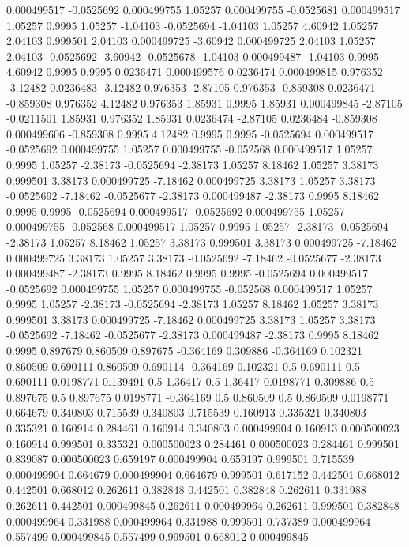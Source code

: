 0.000499517 -0.0525692
0.000499755 1.05257
0.000499755 -0.0525681
0.000499517 1.05257
0.9995 1.05257
-1.04103 -0.0525694
-1.04103 1.05257
4.60942 1.05257
2.04103 0.999501
2.04103 0.000499725
-3.60942 0.000499725
2.04103 1.05257
2.04103 -0.0525692
-3.60942 -0.0525678
-1.04103 0.000499487
-1.04103 0.9995
4.60942 0.9995
0.9995 0.0236471
0.000499576 0.0236474
0.000499815 0.976352
-3.12482 0.0236483
-3.12482 0.976353
-2.87105 0.976353
-0.859308 0.0236471
-0.859308 0.976352
4.12482 0.976353
1.85931 0.9995
1.85931 0.000499845
-2.87105 -0.0211501
1.85931 0.976352
1.85931 0.0236474
-2.87105 0.0236484
-0.859308 0.000499606
-0.859308 0.9995
4.12482 0.9995
0.9995 -0.0525694
0.000499517 -0.0525692
0.000499755 1.05257
0.000499755 -0.052568
0.000499517 1.05257
0.9995 1.05257
-2.38173 -0.0525694
-2.38173 1.05257
8.18462 1.05257
3.38173 0.999501
3.38173 0.000499725
-7.18462 0.000499725
3.38173 1.05257
3.38173 -0.0525692
-7.18462 -0.0525677
-2.38173 0.000499487
-2.38173 0.9995
8.18462 0.9995
0.9995 -0.0525694
0.000499517 -0.0525692
0.000499755 1.05257
0.000499755 -0.052568
0.000499517 1.05257
0.9995 1.05257
-2.38173 -0.0525694
-2.38173 1.05257
8.18462 1.05257
3.38173 0.999501
3.38173 0.000499725
-7.18462 0.000499725
3.38173 1.05257
3.38173 -0.0525692
-7.18462 -0.0525677
-2.38173 0.000499487
-2.38173 0.9995
8.18462 0.9995
0.9995 -0.0525694
0.000499517 -0.0525692
0.000499755 1.05257
0.000499755 -0.052568
0.000499517 1.05257
0.9995 1.05257
-2.38173 -0.0525694
-2.38173 1.05257
8.18462 1.05257
3.38173 0.999501
3.38173 0.000499725
-7.18462 0.000499725
3.38173 1.05257
3.38173 -0.0525692
-7.18462 -0.0525677
-2.38173 0.000499487
-2.38173 0.9995
8.18462 0.9995
0.897679 0.860509
0.897675 -0.364169
0.309886 -0.364169
0.102321 0.860509
0.690111 0.860509
0.690114 -0.364169
0.102321 0.5
0.690111 0.5
0.690111 0.0198771
0.139491 0.5
1.36417 0.5
1.36417 0.0198771
0.309886 0.5
0.897675 0.5
0.897675 0.0198771
-0.364169 0.5
0.860509 0.5
0.860509 0.0198771
0.664679 0.340803
0.715539 0.340803
0.715539 0.160913
0.335321 0.340803
0.335321 0.160914
0.284461 0.160914
0.340803 0.000499904
0.160913 0.000500023
0.160914 0.999501
0.335321 0.000500023
0.284461 0.000500023
0.284461 0.999501
0.839087 0.000500023
0.659197 0.000499904
0.659197 0.999501
0.715539 0.000499904
0.664679 0.000499904
0.664679 0.999501
0.617152 0.442501
0.668012 0.442501
0.668012 0.262611
0.382848 0.442501
0.382848 0.262611
0.331988 0.262611
0.442501 0.000499845
0.262611 0.000499964
0.262611 0.999501
0.382848 0.000499964
0.331988 0.000499964
0.331988 0.999501
0.737389 0.000499964
0.557499 0.000499845
0.557499 0.999501
0.668012 0.000499845
